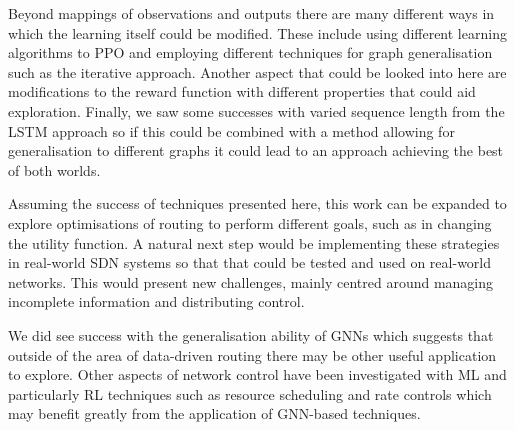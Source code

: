 Beyond mappings of observations and outputs there are many different ways in which the learning itself could be modified. These include using different learning algorithms to PPO and employing different techniques for graph generalisation such as the iterative approach. Another aspect that could be looked into here are modifications to the reward function with different properties that could aid exploration. Finally, we saw some successes with varied sequence length from the LSTM approach so if this could be combined with a method allowing for generalisation to different graphs it could lead to an approach achieving the best of both worlds.

Assuming the success of techniques presented here, this work can be expanded to explore optimisations of routing to perform different goals, such as in changing the utility function. A natural next step would be implementing these strategies in real-world SDN systems so that that could be tested and used on real-world networks. This would present new challenges, mainly centred around managing incomplete information and distributing control.

We did see success with the generalisation ability of GNNs which suggests that outside of the area of data-driven routing there may be other useful application to explore. Other aspects of network control have been investigated with ML and particularly RL techniques such as resource scheduling and rate controls which may benefit greatly from the application of GNN-based techniques.

